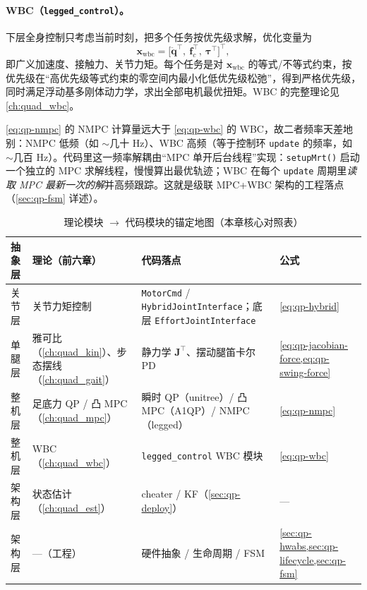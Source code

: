 \paragraph{WBC（\texttt{legged\_control}）。}
下层全身控制只考虑当前时刻，把多个任务按优先级求解，优化变量为\cite{bellicoso2016whole}
\begin{equation}
  \boldsymbol{x}_{\mathrm{wbc}}=\big[\ddot{\boldsymbol{q}}^\top,\ \boldsymbol{f}_c^\top,\ \boldsymbol{\tau}^\top\big]^\top,
  \label{eq:qp-wbc}
\end{equation}
即广义加速度、接触力、关节力矩。每个任务是对 $\boldsymbol{x}_{\mathrm{wbc}}$ 的等式/不等式约束，按优先级在“高优先级等式约束的零空间内最小化低优先级松弛”，得到严格优先级，同时满足浮动基多刚体动力学，求出全部电机最优扭矩\cite{bellicoso2016whole}。WBC 的完整理论见 \cref{ch:quad_wbc}。

\begin{insight}\label{ins:qp-freq-decouple}
\cref{eq:qp-nmpc} 的 NMPC 计算量远大于 \cref{eq:qp-wbc} 的 WBC，故二者频率天差地别：NMPC 低频（如 $\sim$几十 Hz）、WBC 高频（等于控制环 \texttt{update} 的频率，如 $\sim$几百 Hz）。代码里这一频率解耦由“MPC 单开后台线程”实现：\texttt{setupMrt()} 启动一个独立的 MPC 求解线程，慢慢算出最优轨迹；WBC 在每个 \texttt{update} 周期里\emph{读取 MPC 最新一次的解}并高频跟踪。这就是级联 MPC+WBC 架构的工程落点（\cref{sec:qp-fsm} 详述）。
\end{insight}

\begin{table}[H]\centering\small
\caption{理论模块 $\to$ 代码模块的锚定地图（本章核心对照表）}
\begin{tabular}{p{} p{} p{} p{}}
\toprule
抽象层 & 理论（前六章）& 代码落点 & 公式 \\
\midrule
关节层 & 关节力矩控制 & \texttt{MotorCmd} / \texttt{HybridJointInterface}；底层 \texttt{EffortJointInterface} & \cref{eq:qp-hybrid} \\
单腿层 & 雅可比（\cref{ch:quad_kin}）、步态摆线（\cref{ch:quad_gait}）& 静力学 $\mathbf{J}^\top$、摆动腿笛卡尔 PD & \cref{eq:qp-jacobian-force,eq:qp-swing-force} \\
整机层 & 足底力 QP / 凸 MPC（\cref{ch:quad_mpc}）& 瞬时 QP（unitree）/ 凸 MPC（A1QP）/ NMPC（legged）& \cref{eq:qp-nmpc} \\
整机层 & WBC（\cref{ch:quad_wbc}）& \texttt{legged\_control} WBC 模块 & \cref{eq:qp-wbc} \\
架构层 & 状态估计（\cref{ch:quad_est}）& cheater / KF（\cref{sec:qp-deploy}）& --- \\
架构层 & ---（工程）& 硬件抽象 / 生命周期 / FSM & \cref{sec:qp-hwabs,sec:qp-lifecycle,sec:qp-fsm} \\
\bottomrule
\end{tabular}
\label{tab:qp-anchor}
\end{table}

